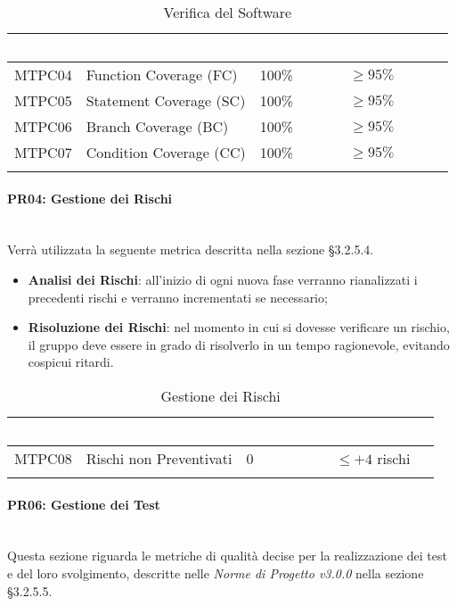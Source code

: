 \begin{longtable}{|C{.15\textwidth}|C{.24\textwidth}|C{.24\textwidth}|C{.24\textwidth}|}
\hline
{}\textbf{\textcolor{white}{ID}} & \textbf{\textcolor{white}{Nome}} & \textbf{\textcolor{white}{Ottimalità}} & \textbf{\textcolor{white}{Accettabilità}}\\
\hline \hline
\endhead
MTPC04 & Function Coverage (FC) & 100\% & $\geqslant 95\%$ \\
\hline
{} MTPC05 & Statement Coverage (SC) & 100\% & $\geqslant 95\%$ \\
\hline
MTPC06 & Branch Coverage (BC) & 100\% & $\geqslant 95\%$ \\
\hline
{}MTPC07 & Condition Coverage (CC) & 100\% & $\geqslant 95\%$ \\
\hline
\caption{Verifica del Software}
\label{VerificaSoftware}
\end{longtable}

\paragraph{PR04: Gestione dei Rischi}\-\\
Verrà utilizzata la seguente metrica descritta nella sezione §3.2.5.4.
\begin{itemize}
	\item \textbf{Analisi dei Rischi}: all'inizio di ogni nuova fase verranno rianalizzati i precedenti rischi e verranno incrementati se necessario;
	\item \textbf{Risoluzione dei Rischi}: nel momento in cui si dovesse verificare un rischio, il gruppo deve essere in grado di risolverlo in un tempo ragionevole, evitando cospicui ritardi.
\end{itemize}

\begin{longtable}{|C{.15\textwidth}|C{.24\textwidth}|C{.24\textwidth}|C{.24\textwidth}|}
\hline
{}\textbf{\textcolor{white}{ID}} & \textbf{\textcolor{white}{Nome}} & \textbf{\textcolor{white}{Ottimalità}} & \textbf{\textcolor{white}{Accettabilità}}\\
\hline \hline
\endhead
MTPC08 & Rischi non Preventivati & 0 & $ \leqslant +4$ rischi \\
\hline
\caption{Gestione dei Rischi}
\label{GestioneRischi}
\end{longtable}


\paragraph{PR06: Gestione dei Test}\-\\
Questa sezione riguarda le metriche di qualità decise per la realizzazione dei test e del loro svolgimento, descritte nelle \textit{Norme di Progetto v3.0.0} nella sezione §3.2.5.5.

